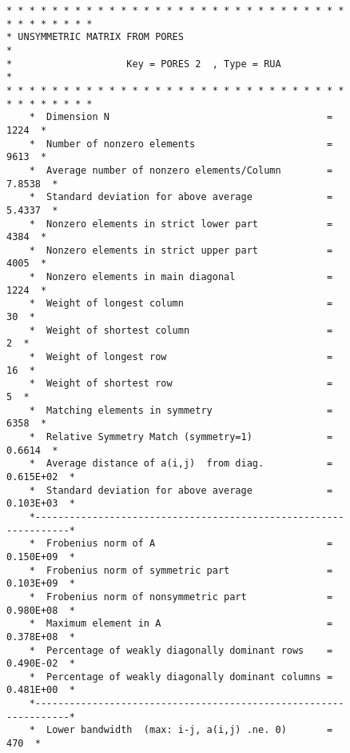 \begin{figure}
\begin{verbatim}
* * * * * * * * * * * * * * * * * * * * * * * * * * * * * * * * * * * * * *
* UNSYMMETRIC MATRIX FROM PORES                                           *
*                    Key = PORES 2  , Type = RUA                          *
* * * * * * * * * * * * * * * * * * * * * * * * * * * * * * * * * * * * * *
    *  Dimension N                                      =       1224  *
    *  Number of nonzero elements                       =       9613  *
    *  Average number of nonzero elements/Column        =     7.8538  *
    *  Standard deviation for above average             =     5.4337  *
    *  Nonzero elements in strict lower part            =       4384  *
    *  Nonzero elements in strict upper part            =       4005  *
    *  Nonzero elements in main diagonal                =       1224  *
    *  Weight of longest column                         =         30  *
    *  Weight of shortest column                        =          2  *
    *  Weight of longest row                            =         16  *
    *  Weight of shortest row                           =          5  *
    *  Matching elements in symmetry                    =       6358  *
    *  Relative Symmetry Match (symmetry=1)             =     0.6614  *
    *  Average distance of a(i,j)  from diag.           =  0.615E+02  *
    *  Standard deviation for above average             =  0.103E+03  *
    *-----------------------------------------------------------------*
    *  Frobenius norm of A                              =  0.150E+09  *
    *  Frobenius norm of symmetric part                 =  0.103E+09  *
    *  Frobenius norm of nonsymmetric part              =  0.980E+08  *
    *  Maximum element in A                             =  0.378E+08  *
    *  Percentage of weakly diagonally dominant rows    =  0.490E-02  *
    *  Percentage of weakly diagonally dominant columns =  0.481E+00  *
    *-----------------------------------------------------------------*
    *  Lower bandwidth  (max: i-j, a(i,j) .ne. 0)       =        470  *

\end{verbatim}
\end{figure}
